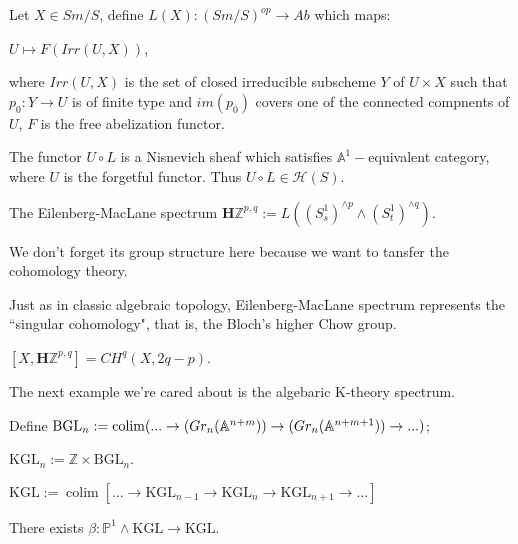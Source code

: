 \begin{definition}
    Let $X\in Sm/S$, define $L(X):(Sm/S)^{op}\to Ab$ which maps:

    $U\mapsto F(Irr(U,X))$,
    
    where $Irr(U,X)$ is the set of closed irreducible subscheme $Y$ of $U\times X$ such that $p_0:Y\to U$ is of finite type and $im(p_0)$ covers one of the connected compnents of $U$, $F$ is the free abelization functor.
\end{definition}

\begin{proposition}
    The functor $U\circ L$ is a Nisnevich sheaf which satisfies $\mathbb{A}^1-$equivalent category, where $U$ is the forgetful functor. Thus $U\circ L\in \mathcal{H}(S)$.
\end{proposition}

\begin{definition}
    The Eilenberg-MacLane spectrum $\mathbf{H}\mathbb{Z}^{p,q}:=  L\left((S_s^1)^{\wedge p} \wedge (S_t^1)^{\wedge q}\right)$.

\end{definition}

We don't forget its group structure here because we want to tansfer the cohomology theory.

Just as in classic algebraic topology, Eilenberg-MacLane spectrum represents the ``singular cohomology", that is, the Bloch's higher Chow group.

\begin{proposition}
    $[X,\mathbf{H}\mathbb{Z}^{p,q}]= CH^q(X,2q-p)$.
\end{proposition}

The next example we're cared about is the algebaric K-theory spectrum.

\begin{definition}
    Define $\text{BGL}_n:=\operatorname{colim} (...\to\text(Gr_n(\mathbb{A}^{n+m}))\to \text(Gr_n(\mathbb{A}^{n+m+1}))\to...)$;

    $\text{KGL}_n:= \mathbb{Z}\times \text{BGL}_n$.

    $\text{KGL}:=\operatorname{colim}[...\to\text{KGL}_{n-1}\to \text{KGL}_n\to \text{KGL}_{n+1}\to...]$
\end{definition}

\begin{proposition}
    There exists $\beta: \mathbb{P}^1\wedge \text{KGL}\to \text{KGL}$.
\end{proposition}

